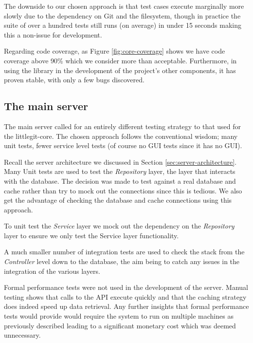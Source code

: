 The downside to our chosen approach is that test cases execute marginally more slowly due to the dependency on Git and the filesystem, though in practice the suite of over a hundred tests still runs (on average) in under 15 seconds making this a non-issue for development.

Regarding code coverage, as Figure \ref{fig:core-coverage} shows we have code coverage above 90\% which we consider more than acceptable. Furthermore, in using the library in the development of the project's other components, it has proven stable, with only a few bugs discovered.


\subsection{The main server}

The main server called for an entirely different testing strategy to that used for the littlegit-core. The chosen approach follows the conventional wisdom; many unit tests, fewer service level tests (of course no GUI tests since it has no GUI).

Recall the server architecture we discussed in Section \ref{sec:server-architecture}. Many Unit tests are used to test the \emph{Repository} layer, the layer that interacts with the database. The decision was made to test against a real database and cache rather than try to mock out the connections since this is tedious. We also get the advantage of checking the database and cache connections using this approach.

To unit test the \emph{Service} layer we mock out the dependency on the \emph{Repository} layer to ensure we only test the Service layer functionality. 

A much smaller number of integration tests are used to check the stack from the \emph{Controller} level down to the database, the aim being to catch any issues in the integration of the various layers. 

Formal performance tests were not used in the development of the server. Manual testing shows that calls to the API execute quickly and that the caching strategy does indeed speed up data retrieval. Any further insights that formal performance tests would provide would require the system to run on multiple machines as previously described leading to a significant monetary cost which was deemed unnecessary.

